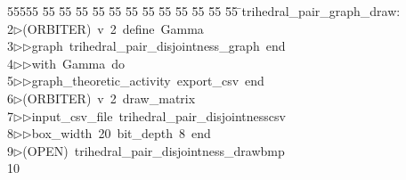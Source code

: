 %
%
\begin{tabbing}
55555 \= 55 \= 55 \= 55 \= 55 \= 55 \= 55 \= 55 \= 55 \= 55 \= 55 \= 55 \= 55 \= \>trihedral\_pair\_graph\_draw:\\[0pt]
2\>$\triangleright$\>(ORBITER)\ v\ 2\ define\ Gamma\ \\[0pt]
3\>$\triangleright$\>$\triangleright$\>graph\ trihedral\_pair\_disjointness\_graph\ end\ \\[0pt]
4\>$\triangleright$\>$\triangleright$\>with\ Gamma\ do\ \\[0pt]
5\>$\triangleright$\>$\triangleright$\>graph\_theoretic\_activity\ export\_csv\ end\\[0pt]
6\>$\triangleright$\>(ORBITER)\ v\ 2\ draw\_matrix\ \\[0pt]
7\>$\triangleright$\>$\triangleright$\>input\_csv\_file\ trihedral\_pair\_disjointnesscsv\ \\[0pt]
8\>$\triangleright$\>$\triangleright$\>box\_width\ 20\ bit\_depth\ 8\ end\\[0pt]
9\>$\triangleright$\>(OPEN)\ trihedral\_pair\_disjointness\_drawbmp\\[0pt]
10\>\end{tabbing}
